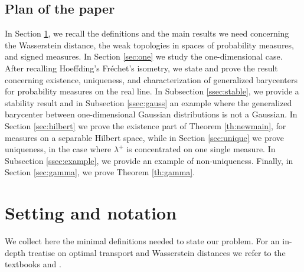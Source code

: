 \documentclass[12pt,a4paper]{article}
\theoremstyle{plain}
\theoremstyle{definition}
\begin{document}
\subsection{Plan of the paper}
In Section \ref{sec:setting}, we recall the definitions and the main results we need concerning the Wasserstein distance, the weak topologies in spaces of probability measures, and signed measures. In Section \ref{sec:one} we study the one-dimensional case. After recalling Hoeffding's Fr\'echet's isometry, we state and prove the result concerning existence, uniqueness, and characterization of generalized barycenters for probability measures on the real line. In Subsection \ref{ssec:stable}, we provide a stability result and in Subsection \ref{ssec:gauss} an example where the generalized barycenter between one-dimensional Gaussian distributions is not a Gaussian. In Section \ref{sec:hilbert} we prove the existence part of Theorem \ref{th:newmain}, for measures on a separable Hilbert space, while in Section \ref{sec:unique} we prove uniqueness, in the case where $\lambda^+$ is concentrated on one single measure. In Subsection \ref{ssec:example}, we provide an example of non-uniqueness. Finally, in Section \ref{sec:gamma}, we prove Theorem \ref{th:gamma}.


\section{Setting and notation}
\label{sec:setting}
We collect here the minimal definitions needed to state our problem. For an in-depth treatise on optimal transport and Wasserstein distances we refer to the textbooks \cite{ambrosio-gigli-savare} and \cite{villani}.
\end{document}
